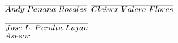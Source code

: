 \documentclass[a4paper, 12pt]{article}
\begin{document}
    

    

    


    

    \vskip 5cm
    \hspace{1.5cm}$\overline{Andy\hspace{.1cm} Panana\hspace{.1cm}Rosales}$ 
    \hspace{4.5cm} $\overline{Cleiver\hspace{.1cm} Valera \hspace{.1cm}Flores}$\\


    \vskip 2cm
    \begin{center}
        $\overline{Jose \hspace{.1cm}L.\hspace{.1cm} Peralta\hspace{.1cm}Lujan}$\\ $Asesor$
    \end{center}

    
\end{document}
